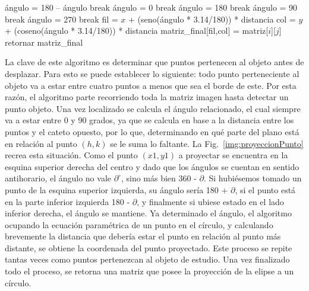 \begin{algorithm}
\begin{algorithmic}[1]
\STATE ángulo = 180 – ángulo
\STATE break
\ENDIF
{}
\STATE ángulo = 0
\STATE break
\ENDIF
{}
\STATE ángulo = 180
\STATE break
\ENDIF
{}
\STATE ángulo = 90
\STATE break
\ENDIF
{}
\STATE ángulo = 270
\STATE break
\ENDIF
\ENDWHILE
\ENDWHILE
\STATE fil = $x$ + (seno(ángulo * 3.14/180)) * distancia
\STATE col = $y$ + (coseno(ángulo * 3.14/180)) * distancia
\ENDWHILE
\STATE matriz\_final[fil,col] = matriz[$i$][$j$]
\STATE retornar matriz\_final
\end{algorithmic}
\end{algorithm}

La clave de este algoritmo es determinar que puntos pertenecen al
objeto antes de desplazar. Para esto se puede establecer lo siguiente:
todo punto perteneciente al objeto va a estar entre cuatro puntos a
menos que sea el borde de este. Por esta razón, el algoritmo parte
recorriendo toda la matriz imagen hasta detectar un punto objeto. Una
vez localizado se calcula el ángulo relacionado, el cual siempre va a
estar entre 0 y 90 grados, ya que se calcula en base a la distancia
entre los puntos y el cateto opuesto, por lo que, determinando en qué
parte del plano está en relación al punto $(h,k)$ se le suma lo
faltante. La Fig.~\ref{img:proyeccionPunto} recrea esta situación.
Como el punto $(x1,y1)$ a proyectar se encuentra en la esquina
superior derecha del centro y dado que los ángulos se cuentan en
sentido antihorario, el ángulo no vale $\partial^\circ$, sino más bien
360 - $\partial$. Si hubiésemos tomado un punto de la esquina superior
izquierda, su ángulo sería 180 + $\partial$, si el punto está en la
parte inferior izquierda 180 - $\partial$, y finalmente si ubiese
estado en el lado inferior derecha, el ángulo se mantiene. Ya
determinado el ángulo, el algoritmo ocupando la ecuación paramétrica
de un punto en el círculo, y calculando brevemente la distancia que
debería estar el punto en relación al punto más distante, se obtiene
la coordenada del punto proyectado. Este proceso se repite tantas
veces como puntos pertenezcan al objeto de estudio. Una vez finalizado
todo el proceso, se retorna una matriz que posee la proyección de la
elipse a un círculo.

